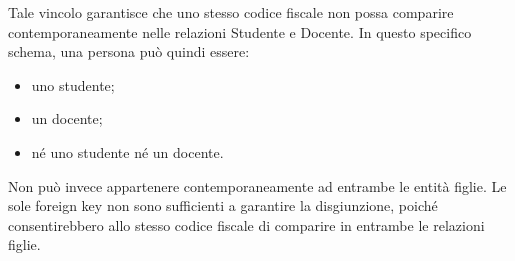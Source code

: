 \noindent
Tale vincolo garantisce che uno stesso codice
fiscale non possa comparire contemporaneamente
nelle relazioni Studente e Docente.
In questo specifico schema, una persona può
quindi essere:
\begin{itemize}
    \item uno studente;

    \item un docente;

    \item né uno studente né un docente.
\end{itemize}
\noindent
Non può invece appartenere contemporaneamente
ad entrambe le entità figlie.
Le sole foreign key non sono sufficienti
a garantire la disgiunzione, poiché consentirebbero
allo stesso codice fiscale di comparire
in entrambe le relazioni figlie.


